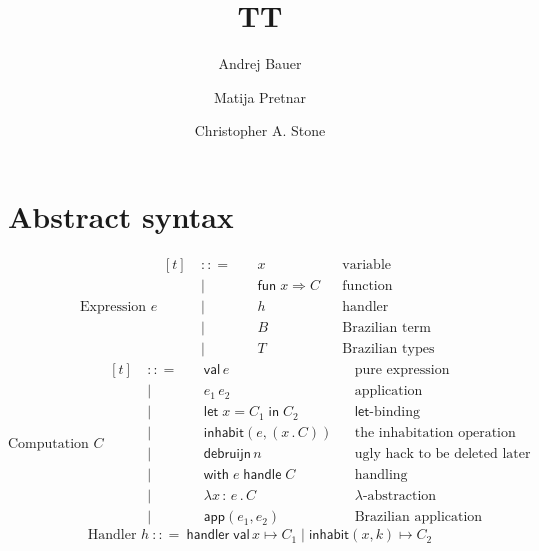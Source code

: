 \documentclass{article}
\newcommand{\bnf}{\ \mathrel{{:}{:}{=}}\ }
\newcommand{\bnfor}{\ \mid\ \ }
\newcommand{\x}{x}     %
\newcommand{\C}{C}     %
\newcommand{\e}{e}     %
\newcommand{\rgn}{r}   %
\newcommand{\h}{h}     %
\newcommand{\T}{T}     %
\newcommand{\val}{\mathsf{val}\,} %
\newcommand{\letin}[1]{\mathsf{let}\; #1 \;\mathsf{in}\;} %
\newcommand{\inhabit}[2]{\mathsf{inhabit}(#1, #2)} %
\newcommand{\withhandle}[1]{\mathsf{with}\;#1\;\mathsf{handle}\;} %
\newcommand{\cont}[2]{(#1 \,.\, #2)} %
\newcommand{\abs}[1]{\mathsf{abs}\;#1\;\mathsf{in}\;} %
\newcommand{\new}[2]{\mathsf{new}(#1,#2)} %
\newcommand{\fun}[1]{\mathsf{fun}\;#1\Rightarrow} %
\newcommand{\app}[2]{#1\,#2} %
\newcommand{\lam}[2]{\lambda #1 \,{:}\, #2 \,.\,} %
\newcommand{\handler}[5]{\mathsf{handler}\; \val #1 \mapsto #2 \mid \inhabit{#3}{#4} \mapsto #5}
\newcommand{\makeApp}[2]{\mathsf{app}(#1,#2)} %
\newcommand{\debruijn}[1]{\mathsf{debruijn}\,#1} %
\begin{document}
\title{TT}
\author{Andrej Bauer \and Matija Pretnar \and Christopher A. Stone}
\maketitle

\section{Abstract syntax}
\label{sec:abstract-syntax}

\begin{equation*}
  \text{Expression $\e$}
  \begin{aligned}[t]
    &\bnf   {} && \x          && \text{variable} \\
    &\bnfor {} && \fun{x} \C  && \text{function} \\
    &\bnfor {} && h           && \text{handler} \\
    &\bnfor {} && B           && \text{Brazilian term} \\
    &\bnfor {} && T           && \text{Brazilian types}
  \end{aligned}  
\end{equation*}
%
\begin{equation*}
  \text{Computation $\C$}
  \begin{aligned}[t]
    &\bnf   {} && \val \e                && \text{pure expression} \\
    &\bnfor {} && \app{\e_1}{\e_2}   && \text{application} \\
    &\bnfor {} && \letin{\x = \C_1} \C_2  && \text{$\mathsf{let}$-binding} \\
    &\bnfor {} && \inhabit{\e}{\cont{\x}{\C}} && \text{the inhabitation operation} \\
    &\bnfor {} && \debruijn{n} && \text{ugly hack to be deleted later} \\
    &\bnfor {} && \withhandle{\e} \C && \text{handling} \\
    &\bnfor {} && \lam{\x}{\e} \C   && \text{$\lambda$-abstraction} \\
    &\bnfor {} && \makeApp{\e_1}{\e_2}   && \text{Brazilian application}
  \end{aligned}  
\end{equation*}
%
\begin{equation*}
  \text{Handler $\h$}
  \bnf \handler{\x}{\C_1}{\x}{k}{\C_2}
\end{equation*}
\end{document}
